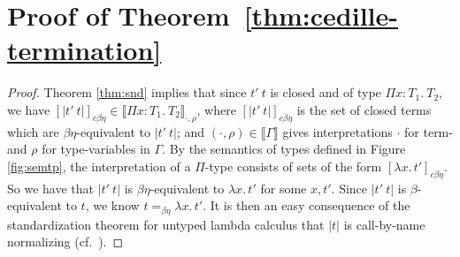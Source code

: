 \documentclass{article}
\newcommand{\interp}[1]{\llbracket #1 \rrbracket}
\begin{document}
\section{Proof of Theorem~\ref{thm:cedille-termination}}
\begin{proof}
Theorem \ref{thm:snd} implies that since
$t'\ t$ is closed and of type $\Pi x:T_1.\ T_2$, we have
$[|t'\ t|]_{c\beta\eta}\in \interp{\Pi x:T_1.\ T_2}_{\cdot,\rho}$,
where $[|t'\ t|]_{c\beta\eta}$ is the set of closed terms which are
$\beta\eta$-equivalent to $|t'\ t|$; and
$(\cdot,\rho)\in\interp{\Gamma}$ gives interpretations $\cdot$ for
term- and $\rho$ for type-variables in $\Gamma$.  By the semantics of
types defined in Figure \ref{fig:semtp}, the
interpretation of a $\Pi$-type consists of sets of the form
$[\lambda x.\,t']_{c\beta\eta}$.  So we have that $|t'\ t|$ is $\beta\eta$-equivalent to
$\lambda x.\, t'$ for some $x, t'$.  
Since $|t'\ t|$ is $\beta$-equivalent to $t$, we know $t =_{\beta\eta} \lambda x.\, t'$.
It is then an easy consequence of the
standardization theorem for untyped lambda calculus that $|t|$ is
call-by-name normalizing (cf.~\cite{Kashima2000}).

\end{proof}
\end{document}
